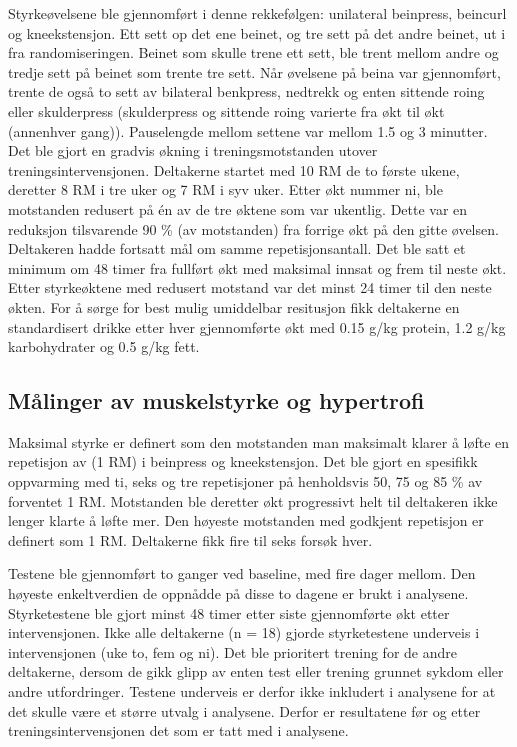 \documentclass[
  letterpaper,
  DIV=11,
  numbers=noendperiod]{scrreprt}
\begin{document}
Styrkeøvelsene ble gjennomført i denne rekkefølgen: unilateral
beinpress, beincurl og kneekstensjon. Ett sett op det ene beinet, og tre
sett på det andre beinet, ut i fra randomiseringen. Beinet som skulle
trene ett sett, ble trent mellom andre og tredje sett på beinet som
trente tre sett. Når øvelsene på beina var gjennomført, trente de også
to sett av bilateral benkpress, nedtrekk og enten sittende roing eller
skulderpress (skulderpress og sittende roing varierte fra økt til økt
(annenhver gang)). Pauselengde mellom settene var mellom 1.5 og 3
minutter. Det ble gjort en gradvis økning i treningsmotstanden utover
treningsintervensjonen. Deltakerne startet med 10 RM de to første ukene,
deretter 8 RM i tre uker og 7 RM i syv uker. Etter økt nummer ni, ble
motstanden redusert på én av de tre øktene som var ukentlig. Dette var
en reduksjon tilsvarende 90 \% (av motstanden) fra forrige økt på den
gitte øvelsen. Deltakeren hadde fortsatt mål om samme repetisjonsantall.
Det ble satt et minimum om 48 timer fra fullført økt med maksimal innsat
og frem til neste økt. Etter styrkeøktene med redusert motstand var det
minst 24 timer til den neste økten. For å sørge for best mulig
umiddelbar resitusjon fikk deltakerne en standardisert drikke etter hver
gjennomførte økt med 0.15 g/kg protein, 1.2 g/kg karbohydrater og 0.5
g/kg fett.

\subsection{Målinger av muskelstyrke og
hypertrofi}\label{muxe5linger-av-muskelstyrke-og-hypertrofi}

Maksimal styrke er definert som den motstanden man maksimalt klarer å
løfte en repetisjon av (1 RM) i beinpress og kneekstensjon. Det ble
gjort en spesifikk oppvarming med ti, seks og tre repetisjoner på
henholdsvis 50, 75 og 85 \% av forventet 1 RM. Motstanden ble deretter
økt progressivt helt til deltakeren ikke lenger klarte å løfte mer. Den
høyeste motstanden med godkjent repetisjon er definert som 1 RM.
Deltakerne fikk fire til seks forsøk hver.

Testene ble gjennomført to ganger ved baseline, med fire dager mellom.
Den høyeste enkeltverdien de oppnådde på disse to dagene er brukt i
analysene. Styrketestene ble gjort minst 48 timer etter siste
gjennomførte økt etter intervensjonen. Ikke alle deltakerne (n = 18)
gjorde styrketestene underveis i intervensjonen (uke to, fem og ni). Det
ble prioritert trening for de andre deltakerne, dersom de gikk glipp av
enten test eller trening grunnet sykdom eller andre utfordringer.
Testene underveis er derfor ikke inkludert i analysene for at det skulle
være et større utvalg i analysene. Derfor er resultatene før og etter
treningsintervensjonen det som er tatt med i analysene.
\end{document}
